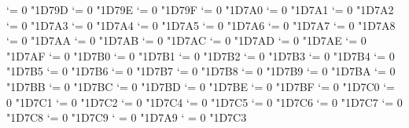 {  \Umathcode `\Ξ = 0 \normalfam "1D79D 
  \Umathcode `\Ο = 0 \normalfam "1D79E 
  \Umathcode `\Π = 0 \normalfam "1D79F 
  \Umathcode `\Ρ = 0 \normalfam "1D7A0 
  \Umathcode `\ϴ = 0 \normalfam "1D7A1 
  \Umathcode `\Σ = 0 \normalfam "1D7A2 
  \Umathcode `\Τ = 0 \normalfam "1D7A3 
  \Umathcode `\Υ = 0 \normalfam "1D7A4 
  \Umathcode `\Φ = 0 \normalfam "1D7A5 
  \Umathcode `\Χ = 0 \normalfam "1D7A6 
  \Umathcode `\Ψ = 0 \normalfam "1D7A7 
  \Umathcode `\Ω = 0 \normalfam "1D7A8 
  \Umathcode `\α = 0 \normalfam "1D7AA 
  \Umathcode `\β = 0 \normalfam "1D7AB 
  \Umathcode `\γ = 0 \normalfam "1D7AC 
  \Umathcode `\δ = 0 \normalfam "1D7AD 
  \Umathcode `\ε = 0 \normalfam "1D7AE 
  \Umathcode `\ζ = 0 \normalfam "1D7AF 
  \Umathcode `\η = 0 \normalfam "1D7B0 
  \Umathcode `\θ = 0 \normalfam "1D7B1 
  \Umathcode `\ι = 0 \normalfam "1D7B2 
  \Umathcode `\κ = 0 \normalfam "1D7B3 
  \Umathcode `\λ = 0 \normalfam "1D7B4 
  \Umathcode `\μ = 0 \normalfam "1D7B5 
  \Umathcode `\ν = 0 \normalfam "1D7B6 
  \Umathcode `\ξ = 0 \normalfam "1D7B7 
  \Umathcode `\ο = 0 \normalfam "1D7B8 
  \Umathcode `\π = 0 \normalfam "1D7B9 
  \Umathcode `\ρ = 0 \normalfam "1D7BA 
  \Umathcode `\ς = 0 \normalfam "1D7BB 
  \Umathcode `\σ = 0 \normalfam "1D7BC 
  \Umathcode `\τ = 0 \normalfam "1D7BD 
  \Umathcode `\υ = 0 \normalfam "1D7BE 
  \Umathcode `\φ = 0 \normalfam "1D7BF 
  \Umathcode `\χ = 0 \normalfam "1D7C0 
  \Umathcode `\ψ = 0 \normalfam "1D7C1 
  \Umathcode `\ω = 0 \normalfam "1D7C2 
  \Umathcode `\ϵ = 0 \normalfam "1D7C4 
  \Umathcode `\ϑ = 0 \normalfam "1D7C5 
  \Umathcode `\ϰ = 0 \normalfam "1D7C6 
  \Umathcode `\ϕ = 0 \normalfam "1D7C7 
  \Umathcode `\ϱ = 0 \normalfam "1D7C8 
  \Umathcode `\ϖ = 0 \normalfam "1D7C9 
  \Umathcode `\∇ = 0 \normalfam "1D7A9 
  \Umathcode `\∂ = 0 \normalfam "1D7C3 
\tensfbfit}%
